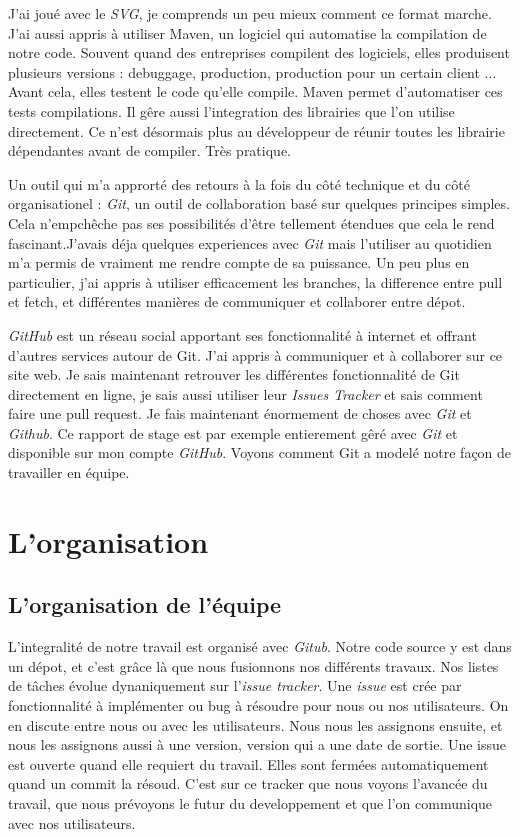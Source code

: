J'ai joué avec le \textit{SVG}, je comprends un peu mieux comment ce format marche. J'ai aussi appris à utiliser Maven, un logiciel qui automatise la compilation de notre code. Souvent quand des entreprises compilent des logiciels, elles produisent plusieurs versions : debuggage, production, production pour un certain client ... Avant cela, elles testent le code qu'elle compile. Maven permet d'automatiser ces tests compilations. Il gêre aussi l'integration des librairies que l'on utilise directement. Ce n'est désormais plus au développeur de réunir toutes les librairie dépendantes avant de compiler. Très pratique. 

Un outil qui m'a approrté des retours à la fois du côté technique et du côté organisationel : \textit{Git}, un outil de collaboration  basé sur quelques principes simples. Cela n'empchêche pas ses possibilités d'être tellement étendues que cela le rend fascinant.J'avais déja quelques experiences avec \textit{Git} mais l'utiliser au quotidien m'a permis de vraiment me rendre compte de sa puissance. Un peu plus en particulier, j'ai appris à utiliser efficacement les branches, la difference entre pull et fetch, et différentes manières de communiquer et collaborer entre dépot.

\textit{GitHub} est un réseau social apportant ses fonctionnalité à internet et offrant d'autres services autour de Git. J'ai appris à communiquer et à collaborer sur ce site web. Je sais maintenant retrouver les différentes fonctionnalité de Git directement en ligne, je sais aussi utiliser leur \textit{Issues Tracker} et sais comment faire une pull request. Je fais maintenant énormement de choses avec \textit{Git} et \textit{Github}. Ce rapport de stage est par exemple entierement gêré avec \textit{Git} et disponible sur mon compte \textit{GitHub}.
Voyons comment Git a modelé notre façon de travailler en équipe.


\section{L'organisation}

\subsection{L'organisation de l'équipe}
L'integralité de notre travail est organisé avec \textit{Gitub}. Notre code source y est dans un dépot, et c'est grâce là que nous fusionnons nos différents travaux. Nos listes de tâches évolue dynaniquement sur l'\textit{issue tracker}. Une \textit{issue} est crée par fonctionnalité à implémenter ou bug à résoudre pour nous ou nos utilisateurs. On en discute entre nous ou avec les utilisateurs. Nous nous les assignons ensuite, et nous les assignons aussi à une version, version qui a une date de sortie. Une issue est ouverte quand elle requiert du travail. Elles sont fermées automatiquement quand un commit la résoud. C'est sur ce tracker que nous voyons l'avancée du travail, que nous prévoyons le futur du developpement et que l'on communique avec nos utilisateurs.

